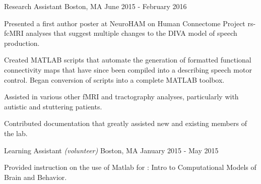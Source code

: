 \begin{cventries}
    {Research Assistant}
    {Boston, MA}
    {June 2015 - February 2016}
    {\begin{cvitems}
        \item{Presented a first author 
            {poster} at NeuroHAM on Human Connectome Project rs-fcMRI analyses that
            suggest multiple changes to the DIVA model of speech 
            production.\vspace*{0.1cm}}
        \item{Created MATLAB scripts that automate the generation of formatted
            functional 
            {connectivity maps} that have since been compiled into a  describing speech motor control. Began
            conversion of scripts into a complete 
            {MATLAB toolbox}.\vspace*{0.1cm}}
        \item{Assisted in various other fMRI and tractography analyses, particularly
            with autistic and stuttering patients.\vspace*{0.1cm}}
        \item{Contributed 
            {documentation} that greatly assisted new and existing members of the lab.}
    \end{cvitems}}
    \vspace*{0.2cm}
    
    {Learning Assistant \textnormal{\small{\textit{(volunteer)}}}}
    {Boston, MA}
    {January 2015 - May 2015}
    {\begin{cvitems}
        \item{Provided instruction on the use of Matlab for : Intro to Computational Models of
            Brain and Behavior.}
    \end{cvitems}}
    \vspace*{0.2cm}
    

\end{cventries}
